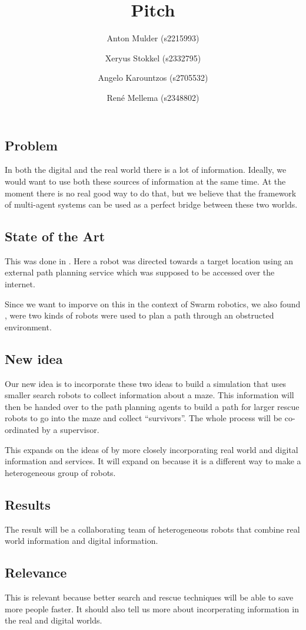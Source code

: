 \documentclass[a4paper,10pt]{article}
\title{Pitch}
\author{Anton Mulder (s2215993) \and Xeryus Stokkel (s2332795) \and Angelo
    Karountzos (s2705532) \and Ren\'e Mellema (s2348802)}
\date{}
\begin{document}
\maketitle

\subsection*{Problem}
In both the digital and the real world there is a lot of information.
Ideally, we would want to use both these sources of information at the same
time. At the moment there is no real good way to do that, but we believe
that the framework of multi-agent systems can be used as a perfect bridge
between these two worlds. 

\subsection*{State of the Art}
This was done in \citet{intframe}. Here a robot was directed towards
a target location using an external path planning service which was
supposed to be accessed over the internet. 

Since we want to imporve on this in the context of Swarm robotics, we also
found \citet{selforg}, were two kinds of robots were used to plan a path
through an obstructed environment. 

\subsection*{New idea}
Our new idea is to incorporate these two ideas to build a simulation that uses
smaller search robots to collect information about a maze. This information will
then be handed over to the path planning agents to build a path for larger
rescue robots to go into the maze and collect ``survivors''. The whole
process will be co-ordinated by a supervisor. 

This expands on the ideas of
\citet{intframe} by more closely incorporating real world and digital
information and services. It will expand on \citet{selforg} because it is a
different way to make a heterogeneous group of robots.

\subsection*{Results}
The result will be a collaborating team of heterogeneous robots that
combine real world information and digital information. 

\subsection*{Relevance}
This is relevant because better search and rescue techniques will be able
to save more people faster. It should also tell us more about incorperating
information in the real and digital worlds. 



\end{document}
